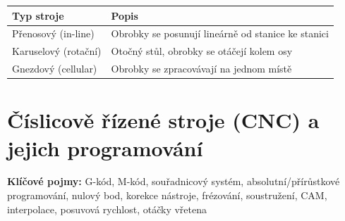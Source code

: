 \documentclass[a4paper,10pt]{article}
\begin{document}
\begin{vysvetlenibox}
\begin{center}
\begin{tabularx}{0.95\linewidth}{@{} l X @{}}
    \toprule
    \textbf{Typ stroje} & \textbf{Popis} \\
    \midrule
    Přenosový (in-line) & Obrobky se posunují lineárně od stanice ke stanici \\
    Karuselový (rotační) & Otočný stůl, obrobky se otáčejí kolem osy \\
    Gnezdový (cellular)  & Obrobky se zpracovávají na jednom místě \\
    \bottomrule
\end{tabularx}
\end{center}
\end{vysvetlenibox}

\section{Číslicově řízené stroje (CNC) a jejich programování}

\begin{pojmybox}
\textbf{Klíčové pojmy:}
G-kód, M-kód, souřadnicový systém, absolutní/přírůstkové programování,
nulový bod, korekce nástroje, frézování, soustružení, CAM,
interpolace, posuvová rychlost, otáčky vřetena
\end{pojmybox}
\end{document}

